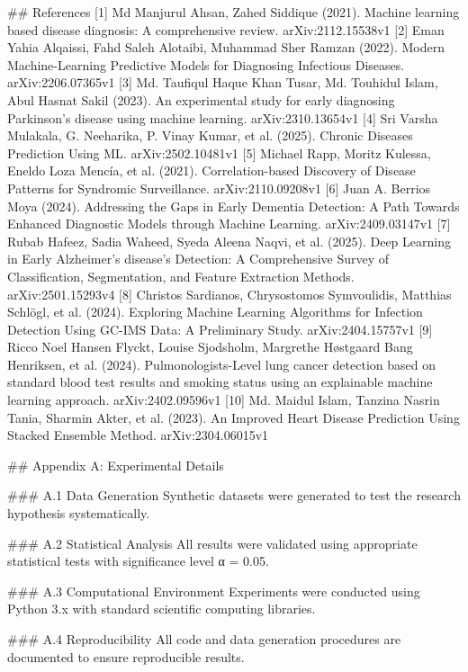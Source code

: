 \documentclass{article}
\begin{document}
## References
[1] Md Manjurul Ahsan, Zahed Siddique (2021). Machine learning based disease diagnosis: A comprehensive review. arXiv:2112.15538v1
[2] Eman Yahia Alqaissi, Fahd Saleh Alotaibi, Muhammad Sher Ramzan (2022). Modern Machine-Learning Predictive Models for Diagnosing Infectious   Diseases. arXiv:2206.07365v1
[3] Md. Taufiqul Haque Khan Tusar, Md. Touhidul Islam, Abul Hasnat Sakil (2023). An experimental study for early diagnosing Parkinson's disease using   machine learning. arXiv:2310.13654v1
[4] Sri Varsha Mulakala, G. Neeharika, P. Vinay Kumar, et al. (2025). Chronic Diseases Prediction Using ML. arXiv:2502.10481v1
[5] Michael Rapp, Moritz Kulessa, Eneldo Loza Mencía, et al. (2021). Correlation-based Discovery of Disease Patterns for Syndromic   Surveillance. arXiv:2110.09208v1
[6] Juan A. Berrios Moya (2024). Addressing the Gaps in Early Dementia Detection: A Path Towards Enhanced   Diagnostic Models through Machine Learning. arXiv:2409.03147v1
[7] Rubab Hafeez, Sadia Waheed, Syeda Aleena Naqvi, et al. (2025). Deep Learning in Early Alzheimer's disease's Detection: A Comprehensive   Survey of Classification, Segmentation, and Feature Extraction Methods. arXiv:2501.15293v4
[8] Christos Sardianos, Chrysostomos Symvoulidis, Matthias Schlögl, et al. (2024). Exploring Machine Learning Algorithms for Infection Detection Using   GC-IMS Data: A Preliminary Study. arXiv:2404.15757v1
[9] Ricco Noel Hansen Flyckt, Louise Sjodsholm, Margrethe Høstgaard Bang Henriksen, et al. (2024). Pulmonologists-Level lung cancer detection based on standard blood test   results and smoking status using an explainable machine learning approach. arXiv:2402.09596v1
[10] Md. Maidul Islam, Tanzina Nasrin Tania, Sharmin Akter, et al. (2023). An Improved Heart Disease Prediction Using Stacked Ensemble Method. arXiv:2304.06015v1


## Appendix A: Experimental Details

### A.1 Data Generation
Synthetic datasets were generated to test the research hypothesis systematically.

### A.2 Statistical Analysis
All results were validated using appropriate statistical tests with significance level α = 0.05.

### A.3 Computational Environment
Experiments were conducted using Python 3.x with standard scientific computing libraries.

### A.4 Reproducibility
All code and data generation procedures are documented to ensure reproducible results.
\end{document}
